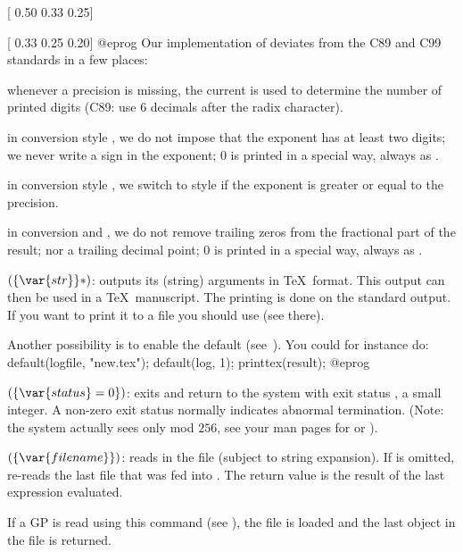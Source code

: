 [ 0.50  0.33  0.25]

[ 0.33  0.25  0.20]
@eprog
 Our implementation of 
deviates from the C89 and C99 standards in a few places:

\item whenever a precision is missing, the current  is
used to determine the number of printed digits (C89: use 6 decimals after
the radix character).

\item in conversion style , we do not impose that the
exponent has at least two digits; we never write a \kbd{+} sign in the
exponent; 0 is printed in a special way, always as .

\item in conversion style , we switch to style  if the
exponent is greater or equal to the precision.

\item in conversion  and , we do not remove trailing zeros
 from the fractional part of the result; nor a trailing decimal point;
 0 is printed in a special way, always as .

$(\{\var{str}\}*)$: \label{se:printtex}outputs its (string) arguments in \TeX\ format. This output can then be
used in a \TeX\ manuscript.
The printing is done on the standard output. If you want to print it to a
file you should use  (see there).

Another possibility is to enable the  default
(see~).
You could for instance do:
%
\bprog
default(logfile, "new.tex");
default(log, 1);
printtex(result);
@eprog

$(\{\var{status} = 0\})$: \label{se:quit}exits  and return to the system with exit status
, a small integer. A non-zero exit status normally indicates
abnormal termination. (Note: the system actually sees only
 mod $256$, see your man pages for  or ).

$(\{\var{filename}\})$: \label{se:read}reads in the file
 (subject to string expansion). If  is
omitted, re-reads the last file that was fed into . The return
value is the result of the last expression evaluated.

If a GP  is read using this command (see
), the file is loaded and the last object in the file
is returned.

